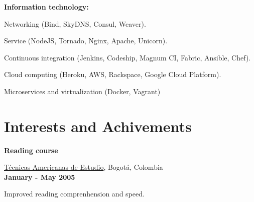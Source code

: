 \halfblankline

\textbf{Information technology:} 
    \begin{innerlist}
\item Networking (Bind, SkyDNS, Consul, Weaver).
\item Service (NodeJS, Tornado, Nginx, Apache, Unicorn).
\item Continuous integration (Jenkins, Codeship, Magnum CI,
Fabric, Ansible, Chef).
\item Cloud computing (Heroku, AWS, Rackspace, Google Cloud Platform).
\item Microservices and virtualization (Docker, Vagrant)
    \end{innerlist}

% 
% 
% 


%
% 
% 

% 

\section{Interests and Achivements}
%
\textbf{Reading course}
\begin{outerlist}

\item[] \href{http://www.tecnicasamericanas.com/}{T\'ecnicas Americanas
de Estudio}, Bogot\'a, Colombia%
        \\ \textbf{January - May 2005}
\begin{innerlist}
\item Improved reading comprenhension and speed.
\end{innerlist}
\end{outerlist}

